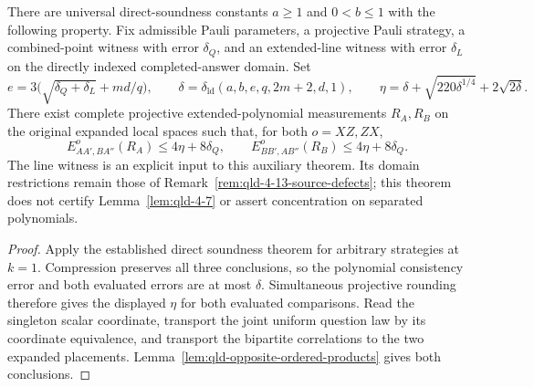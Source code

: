 \begin{theorem}
\label{thm:qld-rounded-polynomial-ordered}
\leanok
There are universal direct-soundness constants $a\geq1$ and $0<b\leq1$
with the following property. Fix admissible Pauli parameters, a projective
Pauli strategy, a combined-point witness with error $\delta_Q$, and an
extended-line witness with error $\delta_L$ on the directly indexed
completed-answer domain. Set
\[
 e=3\bigl(\sqrt{\delta_Q+\delta_L}+md/q\bigr),\qquad
 \delta=\delta_{\mathrm{ld}}(a,b,e,q,2m+2,d,1),\qquad
 \eta=\delta+\sqrt{220\delta^{1/4}}+2\sqrt{2\delta}.
\]
There exist complete projective extended-polynomial measurements $R_A,R_B$
on the original expanded local spaces such that, for both $o=XZ,ZX$,
\[
 E^o_{AA',BA''}(R_A)\leq4\eta+8\delta_Q,\qquad
 E^o_{BB',AB''}(R_B)\leq4\eta+8\delta_Q.
\]
The line witness is an explicit input to this auxiliary theorem. Its
domain restrictions remain those of
Remark~\ref{rem:qld-4-13-source-defects}; this theorem does not certify
Lemma~\ref{lem:qld-4-7} or assert concentration on separated polynomials.
\end{theorem}
\begin{proof}
\leanok
{}
Apply the established direct soundness theorem for arbitrary strategies
at $k=1$. Compression preserves all three conclusions, so the polynomial
consistency error and both evaluated errors are at most $\delta$.
Simultaneous projective rounding therefore gives the displayed $\eta$
for both evaluated comparisons. Read the singleton scalar coordinate,
transport the joint uniform question law by its coordinate equivalence,
and transport the bipartite correlations to the two expanded placements.
Lemma~\ref{lem:qld-opposite-ordered-products} gives both conclusions.
\end{proof}

